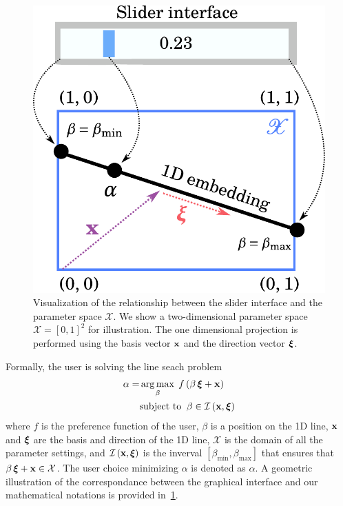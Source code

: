 \begin{figure}[h]
  \centering
  \includegraphics[scale=0.35]{figures/linesearch.pdf}
  \caption{Visualization of the relationship between the slider interface and the parameter space \(\mathcal{X}\).
    We show a two-dimensional parameter space \(\mathcal{X} = {[0, 1]}^2\) for illustration.
    The one dimensional projection is performed using the basis vector \(\mathbf{x}\) and the direction vector \(\bm{\xi}\).
  }\label{fig:linesearch}
\end{figure}
%
Formally, the user is solving the line seach problem
\begin{align}
 \alpha = &\operatorname*{arg\,max}_{ \beta }\; f\,(\beta\,\bm{\xi} + \mathbf{x}) \label{eq:line_search}\\
 &\text{subject to}\;\; \beta \in \mathcal{I}\left(\mathbf{x}, \bm{\xi}\right) 
\end{align}
{\noindent}where \(f\) is the preference function of the user, \(\beta\) is a position on the 1D line, \(\mathbf{x}\) and \(\bm{\xi}\) are the basis and direction of the 1D line, \(\mathcal{X}\) is the domain of all the parameter settings, and \(\mathcal{I}\left(\mathbf{x}, \bm{\xi}\right)\) is the inverval \([\beta_{\mathrm{min}}, \beta_{\mathrm{max}}]\) that ensures that \(\beta\,\bm{\xi} + \mathbf{x}  \in \mathcal{X}\).
The user choice minimizing \(\alpha\) is denoted as \(\alpha\).
A geometric illustration of the correspondance between the graphical interface and our mathematical notations is provided in~\cref{fig:linesearch}.

